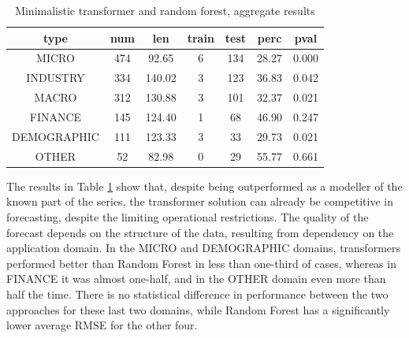 \documentclass[algorithms,article,submit,pdftex,moreauthors]{Definitions/mdpi}
\begin{document}
\begin{table}[H]
\caption{Minimalistic transformer and random forest, aggregate results}
\label{tab:aggregate}
\centering
\begin{tabular}{ccccccc}
\toprule
{\bf type} & {\bf num} & len & {\bf train} & {\bf test} & {\bf perc} & {\bf pval}\\
\midrule
MICRO 		& 474 &  92.65 & 6 & 134 & 28.27 & 0.000\\
INDUSTRY 	& 334 & 140.02 & 3 & 123 & 36.83 & 0.042\\
MACRO 		& 312 & 130.88 & 3 & 101 & 32.37 & 0.021\\
FINANCE 	& 145 & 124.40 & 1 &  68 & 46.90 & 0.247\\
DEMOGRAPHIC & 111 & 123.33 & 3 &  33 & 29.73 & 0.021\\
OTHER 		&  52 &  82.98 & 0 &  29 & 55.77 & 0.661\\
\bottomrule
\end{tabular}
\end{table}

The results in Table \ref{tab:aggregate}  show that, despite being outperformed as a modeller of the known part of the series, the transformer solution can already be competitive in forecasting, despite the limiting operational restrictions. The quality of the forecast depends on the structure of the data, resulting from dependency on the application domain. In the MICRO and DEMOGRAPHIC domains, transformers performed better than Random Forest in less than one-third of cases, whereas in FINANCE it was almost one-half, and in the OTHER domain even more than half the time. There is no statistical difference in performance between the two approaches for these last two domains, while Random Forest has a significantly lower average RMSE for the other four.
\end{document}
